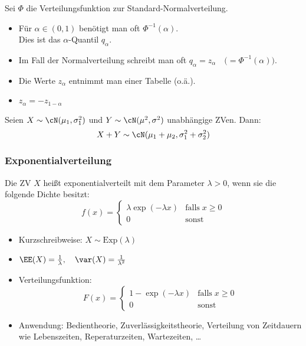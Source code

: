  Sei $\Phi$ die Verteilungsfunktion zur Standard-Normalverteilung.
\begin{itemize}
\item Für $\alpha \in (0,1)$ benötigt man oft $\Phi^{-1}(\alpha)$.\\
Dies ist das $\alpha$-Quantil $q_\alpha$.
\item Im Fall der Normalverteilung schreibt man oft $q_\alpha = z_\alpha \quad\Big(=\Phi^{-1}(\alpha)\Big)$.
\item Die Werte $z_\alpha$ entnimmt man einer Tabelle (o.ä.).
\item $z_\alpha = - z_{1-\alpha}$
\end{itemize}

 Seien $X\sim \cN(\mu_1, \sigma_1^2)$ und $Y\sim \cN(\mu^2, \sigma^2)$ unabhängige ZVen. Dann:
$$X+Y \sim \cN (\mu_1+\mu_2, \sigma_1^2+\sigma_2^2)$$

\subsubsection{Exponentialverteilung}
 Die ZV $X$ heißt exponentialverteilt mit dem Parameter $\lambda >0$, wenn sie die folgende Dichte besitzt:
$$f(x)=\begin{cases}
\lambda \exp(-\lambda x) & \mathrm{falls} \; x\geq 0\\
0 & \mathrm{sonst}
\end{cases}
$$
\begin{itemize}
\item Kurzschreibweise: $X\sim \mathrm{Exp}(\lambda)$
\item $\EE(X)=\frac{1}{\lambda}, \quad \var(X)=\frac{1}{\lambda^2}$
\item Verteilungsfunktion:
$$F(x)=\begin{cases}
1-\exp(-\lambda x) & \mathrm{falls}\; x \geq 0\\
0 & \mathrm{sonst}
\end{cases}$$
\item Anwendung: Bedientheorie, Zuverlässigkeitstheorie, Verteilung von Zeitdauern wie Lebenszeiten, Reperaturzeiten, Wartezeiten, …
\end{itemize}

